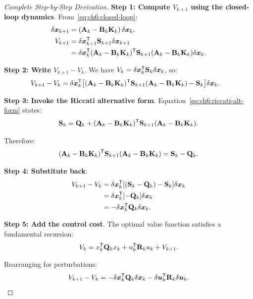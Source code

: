 \begin{proof}[Complete Step-by-Step Derivation]
\textbf{Step 1: Compute $V_{k+1}$ using the closed-loop dynamics}. From~\eqref{eq:ch6:closed-loop}:
\begin{align}
\delta\bm{x}_{k+1} &= (\mathbf{A}_k - \mathbf{B}_k\mathbf{K}_k)\,\delta\bm{x}_k, \\
V_{k+1} &= \delta\bm{x}_{k+1}^{\mathsf{T}}\mathbf{S}_{k+1}\delta\bm{x}_{k+1} \notag\\
&= \delta\bm{x}_k^{\mathsf{T}}(\mathbf{A}_k-\mathbf{B}_k\mathbf{K}_k)^{\mathsf{T}}\mathbf{S}_{k+1}(\mathbf{A}_k-\mathbf{B}_k\mathbf{K}_k)\delta\bm{x}_k.
\label{eq:ch6:Vk1-full}
\end{align}

\textbf{Step 2: Write $V_{k+1} - V_k$}. We have $V_k = \delta\bm{x}_k^{\mathsf{T}}\mathbf{S}_k\delta\bm{x}_k$, so:
\begin{align}
V_{k+1}-V_k &= \delta\bm{x}_k^{\mathsf{T}}\!\left[
(\mathbf{A}_k-\mathbf{B}_k\mathbf{K}_k)^{\mathsf{T}}\mathbf{S}_{k+1}(\mathbf{A}_k-\mathbf{B}_k\mathbf{K}_k)
- \mathbf{S}_k\right]\!\delta\bm{x}_k.
\label{eq:ch6:diff-raw}
\end{align}

\textbf{Step 3: Invoke the Riccati alternative form}. Equation~\eqref{eq:ch6:riccati-alt-form} states:
\begin{equation}
\mathbf{S}_k = \mathbf{Q}_k + (\mathbf{A}_k - \mathbf{B}_k\mathbf{K}_k)^{\mathsf{T}} \mathbf{S}_{k+1} (\mathbf{A}_k - \mathbf{B}_k\mathbf{K}_k).
\end{equation}

Therefore:
\begin{equation}
(\mathbf{A}_k-\mathbf{B}_k\mathbf{K}_k)^{\mathsf{T}}\mathbf{S}_{k+1}(\mathbf{A}_k-\mathbf{B}_k\mathbf{K}_k) = \mathbf{S}_k - \mathbf{Q}_k.
\label{eq:ch6:riccati-substitution}
\end{equation}

\textbf{Step 4: Substitute back}:
\begin{align}
V_{k+1}-V_k &= \delta\bm{x}_k^{\mathsf{T}}\!\left[
(\mathbf{S}_k - \mathbf{Q}_k) - \mathbf{S}_k\right]\!\delta\bm{x}_k \notag\\
&= \delta\bm{x}_k^{\mathsf{T}}\!\left[-\mathbf{Q}_k\right]\!\delta\bm{x}_k \\
&= -\delta\bm{x}_k^{\mathsf{T}}\mathbf{Q}_k\delta\bm{x}_k.
\label{eq:ch6:first-drop}
\end{align}

\textbf{Step 5: Add the control cost}. The optimal value function satisfies a fundamental recursion:
\begin{equation}
V_k = x_k^{\mathsf{T}}\mathbf{Q}_k x_k + u_k^{\mathsf{T}}\mathbf{R}_k u_k + V_{k+1}.
\label{eq:ch6:cost-recursion}
\end{equation}

Rearranging for perturbations:
\begin{equation}
V_{k+1} - V_k = -\delta\bm{x}_k^{\mathsf{T}}\mathbf{Q}_k\delta\bm{x}_k - \delta\bm{u}_k^{\mathsf{T}}\mathbf{R}_k\delta\bm{u}_k.
\label{eq:ch6:value-drop-with-control}
\end{equation}


\end{proof}
